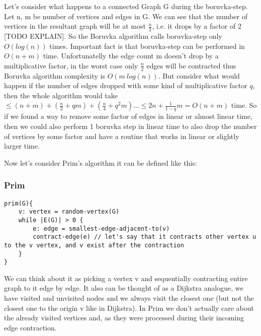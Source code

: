 \documentclass{article}
\begin{document}
Let's consider what happens to a connected Graph G during the boruvka-step. Let n, m be number of vertices and edges in G. We can see that the number of vertices in the resultant graph will be at most $\frac{n}{2}$, i.e. it drops by a factor of 2 [TODO EXPLAIN]. So the Boruvka algorithm calls boruvka-step only $O(log(n))$ times. Important fact is that boruvka-step can be performed in $O(n + m)$ time. Unfortunatelly the edge count m doesn't drop by a multiplicative factor, in the worst case only $\frac{n}{2}$ edges will be contracted thus Boruvka algorithm complexity is $O(m\  log(n))$. But consider what would happen if the number of edges dropped with some kind of multiplicative factor $q$, then the whole algorithm would take $\leq (n + m) + (\frac{n}{2} + qm) + (\frac{n}{4} + q^2m) ... \leq 2n + \frac{1}{1-q} m = O(n + m)$ time. So if we found a way to remove some factor of edges in linear or almost linear time, then we could also perform 1 boruvka step in linear time to also drop the number of vertices by some factor and have a routine that works in linear or slightly larger time.

Now let's consider Prim's algorithm it can be defined like this:
\subsubsection{Prim}
\begin{lstlisting}
prim(G){
    v: vertex = random-vertex(G)
    while |E(G)| > 0 {
        e: edge = smallest-edge-adjacent-to(v)
        contract-edge(e) // let's say that it contracts other vertex u to the v vertex, and v exist after the contraction
    }
}
\end{lstlisting}
We can think about it as picking a vertex v and sequentially contracting entire graph to it edge by edge. It also can be thought of as a Dijkstra analogue, we have visited and unvisited nodes and we always visit the closest one (but not the closest one to the origin v like in Dijkstra). In Prim we don't actually care about the already visited vertices and, as they were processed during their incoming edge contraction.
\end{document}
